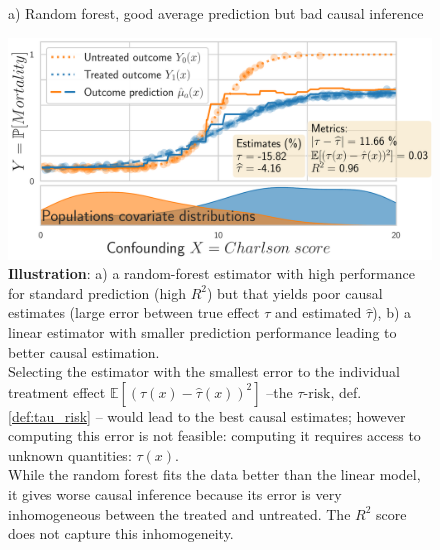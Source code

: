 \documentclass[10pt]{article}
\begin{document}
\begin{multicols}{2}
    \begin{figure}[b!]
        \begin{minipage}{.4\linewidth}
            \caption[The best predictor may not estimate best causal
                effects]{\textbf{Illustration}: a) a random-forest estimator
                with high performance for standard prediction (high $R^2$) but that
                yields poor causal estimates (large error between true effect $\tau$ and
                estimated $\hat{\tau}$), b) a linear estimator with smaller
                prediction performance leading to better causal estimation. \\[1ex]
                Selecting the estimator with the smallest error to the individual
                treatment effect $\mathbb{E}[(\tau(x) - \hat{\tau}(x))^2]$
                --the $\tau\text{-risk}$, def.\,\ref{def:tau_risk} -- would lead to
                the best causal estimates; however computing this error is not
                feasible: computing it requires access to unknown quantities:
                $\tau(x)$. \\[1ex]
                While the random forest fits the data better than the linear model, it
                gives worse causal inference because its error is very inhomogeneous between
                the treated and untreated. The $R^2$ score does not capture this
                inhomogeneity.
            }\label{fig:toy_example} \end{minipage}\hfill%
        \begin{minipage}{.577\linewidth}
            {\sffamily\small a) Random forest, good average prediction but bad
                causal inference}

            \hfill%
            \includegraphics[width=1\linewidth]{images/toy_random_forest_high_R2_high_tau_risk.pdf}%


\end{minipage}
\end{figure}
\end{multicols}
\end{document}

